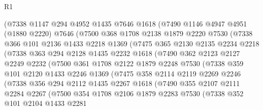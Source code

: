 \begin{lexlean}{R1}
\begin{coremodule}
        (@7338
          @1147
          @294
          @4952
          @1435
          @7646
          @1618
          (@7490
            @1146
            @4947
            @4951
            (@1880 @2220)
            @7646
            (@7500
              @368
              @1708
              @2138
              @1879
              @2220
              @7530
              (@7338
                @366
                @101
                @2136
                @1433
                @2218
                @1369
                (@7475
                  @365
                  @2130
                  @2135
                  @2234
                  @2218
                  (@7338
                    @363
                    @294
                    @2128
                    @1435
                    @2232
                    @1618
                    (@7490
                      @362
                      @2123
                      @2127
                      @2249
                      @2232
                      (@7500
                        @361
                        @1708
                        @2122
                        @1879
                        @2248
                        @7530
                        (@7338
                          @359
                          @101
                          @2120
                          @1433
                          @2246
                          @1369
                          (@7475
                            @358
                            @2114
                            @2119
                            @2269
                            @2246
                            (@7338
                              @356
                              @294
                              @2112
                              @1435
                              @2267
                              @1618
                              (@7490
                                @355
                                @2107
                                @2111
                                @2284
                                @2267
                                (@7500
                                  @354
                                  @1708
                                  @2106
                                  @1879
                                  @2283
                                  @7530
                                  (@7338
                                    @352
                                    @101
                                    @2104
                                    @1433
                                    @2281

\end{coremodule}
\end{lexlean}
